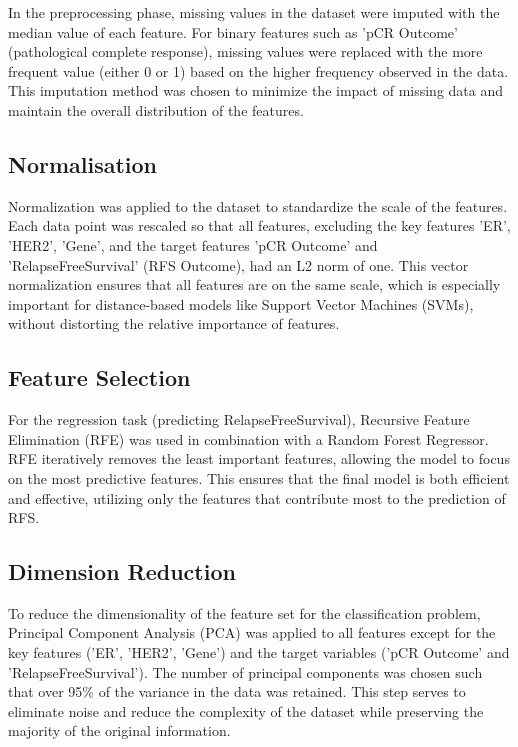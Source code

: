 \documentclass{article}
\begin{document}
In the preprocessing phase, missing values in the dataset were imputed with the median value of each feature. For binary features such as 'pCR Outcome' (pathological complete response), missing values were replaced with the more frequent value (either 0 or 1) based on the higher frequency observed in the data. This imputation method was chosen to minimize the impact of missing data and maintain the overall distribution of the features.

\subsection{Normalisation}

Normalization was applied to the dataset to standardize the scale of the features. Each data point was rescaled so that all features, excluding the key features 'ER', 'HER2', 'Gene', and the target features 'pCR Outcome' and 'RelapseFreeSurvival' (RFS Outcome), had an L2 norm of one. This vector normalization ensures that all features are on the same scale, which is especially important for distance-based models like Support Vector Machines (SVMs), without distorting the relative importance of features.

\subsection{Feature Selection}

For the regression task (predicting RelapseFreeSurvival), Recursive Feature Elimination (RFE) was used in combination with a Random Forest Regressor. RFE iteratively removes the least important features, allowing the model to focus on the most predictive features. This ensures that the final model is both efficient and effective, utilizing only the features that contribute most to the prediction of RFS.

\subsection{Dimension Reduction}

To reduce the dimensionality of the feature set for the classification problem, Principal Component Analysis (PCA) was applied to all features except for the key features ('ER', 'HER2', 'Gene') and the target variables ('pCR Outcome' and 'RelapseFreeSurvival'). The number of principal components was chosen such that over 95\% of the variance in the data was retained. This step serves to eliminate noise and reduce the complexity of the dataset while preserving the majority of the original information.
\end{document}

